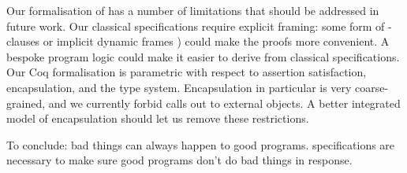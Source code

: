 Our formalisation of \Nec has a number of limitations that should be
addressed in future work.
Our classical specifications require explicit
framing: some form of -clauses or implicit dynamic frames
\cite{Leavens-etal07x,IshtiaqOHearn01,IDF,MattAlex,dafny13})
could make the proofs more convenient.
A bespoke program logic could make it easier to derive 
\Nec from classical specifications.
Our Coq formalisation is parametric with respect to assertion
satisfaction, encapsulation, and the type system. Encapsulation in particular is
very coarse-grained, and we currently forbid 
calls out to external objects.  A better integrated model of
encapsulation should let us remove these restrictions.




To conclude: bad things can always happen to good programs. \Nec
specifications are necessary to make sure good programs don't do bad
things in response.
